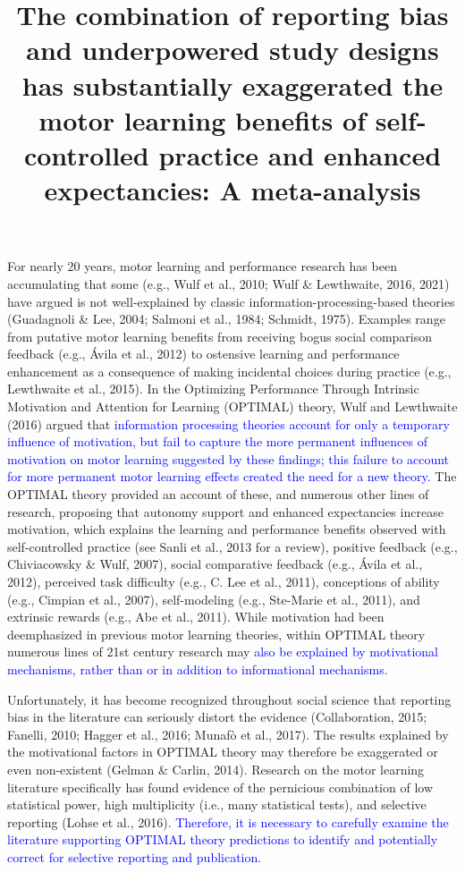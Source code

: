\documentclass[
  man, donotrepeattitle,mask,floatsintext]{apa7}
\title{The combination of reporting bias and underpowered study designs has substantially exaggerated the motor learning benefits of self-controlled practice and enhanced expectancies: A meta-analysis}
\author{\phantom{0}}
\date{}
\affiliation{\phantom{0}}
\begin{document}
\maketitle

For nearly 20 years, motor learning and performance research has been accumulating that some (e.g., Wulf et al., 2010; Wulf \& Lewthwaite, 2016, 2021) have argued is not well-explained by classic information-processing-based theories (Guadagnoli \& Lee, 2004; Salmoni et al., 1984; Schmidt, 1975). Examples range from putative motor learning benefits from receiving bogus social comparison feedback (e.g., Ávila et al., 2012) to ostensive learning and performance enhancement as a consequence of making incidental choices during practice (e.g., Lewthwaite et al., 2015). In the Optimizing Performance Through Intrinsic Motivation and Attention for Learning (OPTIMAL) theory, Wulf and Lewthwaite (2016) argued that \textcolor{blue}{information processing theories account for only a temporary influence of motivation, but fail to capture the more permanent influences of motivation on motor learning suggested by these findings; this failure to account for more permanent motor learning effects created the need for a new theory.} The OPTIMAL theory provided an account of these, and numerous other lines of research, proposing that autonomy support and enhanced expectancies increase motivation, which explains the learning and performance benefits observed with self-controlled practice (see Sanli et al., 2013 for a review), positive feedback (e.g., Chiviacowsky \& Wulf, 2007), social comparative feedback (e.g., Ávila et al., 2012), perceived task difficulty (e.g., C. Lee et al., 2011), conceptions of ability (e.g., Cimpian et al., 2007), self-modeling (e.g., Ste-Marie et al., 2011), and extrinsic rewards (e.g., Abe et al., 2011). While motivation had been deemphasized in previous motor learning theories, within OPTIMAL theory numerous lines of 21st century research may \textcolor{blue}{also be explained by motivational mechanisms, rather than or in addition to informational mechanisms.}

Unfortunately, it has become recognized throughout social science that reporting bias in the literature can seriously distort the evidence (Collaboration, 2015; Fanelli, 2010; Hagger et al., 2016; Munafò et al., 2017). The results explained by the motivational factors in OPTIMAL theory may therefore be exaggerated or even non-existent (Gelman \& Carlin, 2014). Research on the motor learning literature specifically has found evidence of the pernicious combination of low statistical power, high multiplicity (i.e., many statistical tests), and selective reporting (Lohse et al., 2016). \textcolor{blue}{Therefore, it is necessary to carefully examine the literature supporting OPTIMAL theory predictions to identify and potentially correct for selective reporting and publication.}
\end{document}
